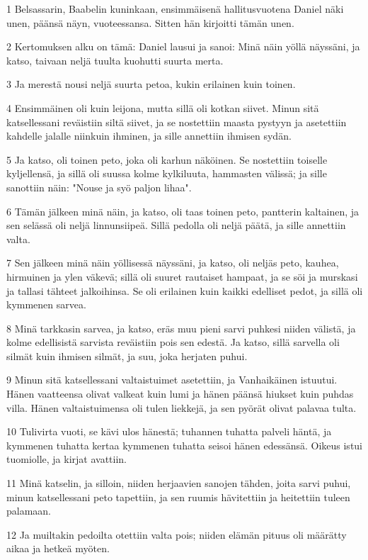 \par 1 Belsassarin, Baabelin kuninkaan, ensimmäisenä hallitusvuotena Daniel näki unen, päänsä näyn, vuoteessansa. Sitten hän kirjoitti tämän unen.
\par 2 Kertomuksen alku on tämä: Daniel lausui ja sanoi: Minä näin yöllä näyssäni, ja katso, taivaan neljä tuulta kuohutti suurta merta.
\par 3 Ja merestä nousi neljä suurta petoa, kukin erilainen kuin toinen.
\par 4 Ensimmäinen oli kuin leijona, mutta sillä oli kotkan siivet. Minun sitä katsellessani reväistiin siltä siivet, ja se nostettiin maasta pystyyn ja asetettiin kahdelle jalalle niinkuin ihminen, ja sille annettiin ihmisen sydän.
\par 5 Ja katso, oli toinen peto, joka oli karhun näköinen. Se nostettiin toiselle kyljellensä, ja sillä oli suussa kolme kylkiluuta, hammasten välissä; ja sille sanottiin näin: "Nouse ja syö paljon lihaa".
\par 6 Tämän jälkeen minä näin, ja katso, oli taas toinen peto, pantterin kaltainen, ja sen selässä oli neljä linnunsiipeä. Sillä pedolla oli neljä päätä, ja sille annettiin valta.
\par 7 Sen jälkeen minä näin yöllisessä näyssäni, ja katso, oli neljäs peto, kauhea, hirmuinen ja ylen väkevä; sillä oli suuret rautaiset hampaat, ja se söi ja murskasi ja tallasi tähteet jalkoihinsa. Se oli erilainen kuin kaikki edelliset pedot, ja sillä oli kymmenen sarvea.
\par 8 Minä tarkkasin sarvea, ja katso, eräs muu pieni sarvi puhkesi niiden välistä, ja kolme edellisistä sarvista reväistiin pois sen edestä. Ja katso, sillä sarvella oli silmät kuin ihmisen silmät, ja suu, joka herjaten puhui.
\par 9 Minun sitä katsellessani valtaistuimet asetettiin, ja Vanhaikäinen istuutui. Hänen vaatteensa olivat valkeat kuin lumi ja hänen päänsä hiukset kuin puhdas villa. Hänen valtaistuimensa oli tulen liekkejä, ja sen pyörät olivat palavaa tulta.
\par 10 Tulivirta vuoti, se kävi ulos hänestä; tuhannen tuhatta palveli häntä, ja kymmenen tuhatta kertaa kymmenen tuhatta seisoi hänen edessänsä. Oikeus istui tuomiolle, ja kirjat avattiin.
\par 11 Minä katselin, ja silloin, niiden herjaavien sanojen tähden, joita sarvi puhui, minun katsellessani peto tapettiin, ja sen ruumis hävitettiin ja heitettiin tuleen palamaan.
\par 12 Ja muiltakin pedoilta otettiin valta pois; niiden elämän pituus oli määrätty aikaa ja hetkeä myöten.
